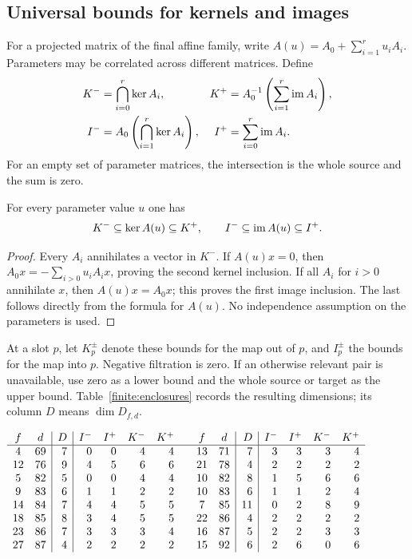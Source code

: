 \subsection{Universal bounds for kernels and images}

For a projected matrix of the final affine family, write
$A(u)=A_0+\sum_{i=1}^r u_iA_i$.  Parameters may be correlated across
different matrices.  Define
\begin{align}
 K^-&=\bigcap_{i=0}^r\ker A_i,&
 K^+&=A_0^{-1}\left(\sum_{i=1}^r\operatorname{im} A_i\right),\label{finite:kernel-bounds}\\
 I^-&=A_0\left(\bigcap_{i=1}^r\ker A_i\right),&
 I^+&=\sum_{i=0}^r\operatorname{im} A_i.\label{finite:image-bounds}
\end{align}
For an empty set of parameter matrices, the intersection is the
whole source and the sum is zero.

\begin{lemma}\label{finite:bounds-valid}
For every parameter value $u$ one has
\[
 K^-\subseteq\ker A(u)\subseteq K^+,
 \qquad I^-\subseteq\operatorname{im} A(u)\subseteq I^+.
\]
\end{lemma}
\begin{proof}
Every $A_i$ annihilates a vector in $K^-$.  If $A(u)x=0$, then
$A_0x=-\sum_{i>0}u_iA_ix$, proving the second kernel inclusion.
If all $A_i$ for $i>0$ annihilate $x$, then $A(u)x=A_0x$;
this proves the first image inclusion.  The last follows directly
from the formula for $A(u)$.  No independence assumption on the
parameters is used.
\end{proof}

At a slot $p$, let $K_p^\pm$ denote these bounds for the map out of
$p$, and $I_p^\pm$ the bounds for the map into $p$.  Negative
filtration is zero.  If an otherwise relevant pair is unavailable,
use zero as a lower bound and the whole source or target as the
upper bound.  Table~\ref{finite:enclosures} records the resulting
dimensions; its column $D$ means $\dim D_{f,d}$.

\begin{table}[htbp]
\centering\small
\(
\begin{array}{cc|r|rrrr@{\qquad}cc|r|rrrr}
 f&d&D&I^-&I^+&K^-&K^+&f&d&D&I^-&I^+&K^-&K^+\\\hline
 4&69&7&0&0&4&4&13&71&7&3&3&3&4\\
 12&76&9&4&5&6&6&21&78&4&2&2&2&2\\
 5&82&5&0&0&4&4&10&82&8&1&5&6&6\\
 9&83&6&1&1&2&2&10&83&6&1&1&2&4\\
 14&84&7&4&4&5&5&7&85&11&0&2&8&9\\
 18&85&8&3&4&5&5&22&86&4&2&2&2&2\\
 23&86&7&3&3&3&4&16&87&5&2&2&3&3\\
 27&87&4&2&2&2&2&15&92&6&2&6&0&6
\end{array}
\)
\caption{Universal lower and upper bounds for images and kernels.}
\label{finite:enclosures}
\end{table}

